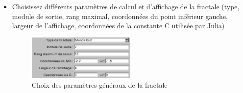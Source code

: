 \documentclass[a4paper,11pt]{article} \usepackage[T1]{fontenc} \usepackage[utf8]{inputenc} \usepackage[francais]{babel}
\begin{document}
\begin{itemize}
  \item Choisissez différents paramètres de calcul et d'affichage de la fractale (type, module de sortie, rang maximal, coordonnées du point inférieur gauche, largeur de l’affichage, coordonnées de la constante C utilisée par Julia)
        \begin{figure}[H] \begin{center} \includegraphics[width=0.5\textwidth]{Images/Parametres.png}
            \caption{Choix des paramètres généraux de la fractale}
        \end{center} \end{figure}



\end{itemize}
\end{document}
